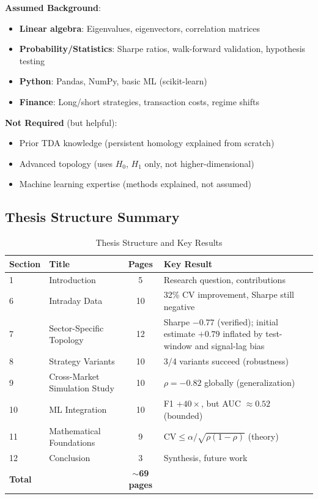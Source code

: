 \textbf{Assumed Background}:
\begin{itemize}
\item \textbf{Linear algebra}: Eigenvalues, eigenvectors, correlation matrices
\item \textbf{Probability/Statistics}: Sharpe ratios, walk-forward validation, hypothesis testing
\item \textbf{Python}: Pandas, NumPy, basic ML (scikit-learn)
\item \textbf{Finance}: Long/short strategies, transaction costs, regime shifts
\end{itemize}

\textbf{Not Required} (but helpful):
\begin{itemize}
\item Prior TDA knowledge (persistent homology explained from scratch)
\item Advanced topology (uses $H_0$, $H_1$ only, not higher-dimensional)
\item Machine learning expertise (methods explained, not assumed)
\end{itemize}

\subsection{Thesis Structure Summary}

\begin{table}[H]
\centering
\caption{Thesis Structure and Key Results}
\label{tab:thesis-structure}
\begin{tabular}{@{}llcl@{}}
\toprule
\textbf{Section} & \textbf{Title} & \textbf{Pages} & \textbf{Key Result} \\
\midrule
1 & Introduction & 5 & Research question, contributions \\
6 & Intraday Data & 10 & 32\% CV improvement, Sharpe still negative \\
7 & Sector-Specific Topology & 12 & Sharpe $-0.77$ (verified); initial estimate $+0.79$ inflated by test-window and signal-lag bias \\
8 & Strategy Variants & 10 & 3/4 variants succeed (robustness) \\
9 & Cross-Market Simulation Study & 10 & $\rho = -0.82$ globally (generalization) \\
10 & ML Integration & 10 & F1 +$40\times$, but AUC $\approx 0.52$ (bounded) \\
11 & Mathematical Foundations & 9 & $\text{CV} \leq \alpha/\sqrt{\rho(1-\rho)}$ (theory) \\
12 & Conclusion & 3 & Synthesis, future work \\
\midrule
\textbf{Total} & & \textbf{$\sim$69 pages} & \\
\bottomrule
\end{tabular}
\end{table}

